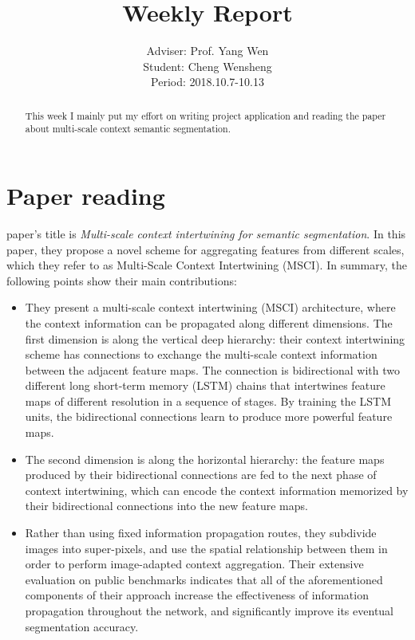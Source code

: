 \documentclass[]{IEEEtran}
\begin{document}
	\title{Weekly Report}
	\author{Adviser: Prof. Yang Wen \\Student: Cheng Wensheng\\ Period: 2018.10.7-10.13
	}
	\maketitle

\begin{abstract}
	This week I mainly put my effort on writing project application and reading the paper about multi-scale context semantic segmentation.
\end{abstract}

\section{Paper reading}
	 paper's title is \emph{Multi-scale context intertwining for semantic segmentation}. In this paper, they propose a novel scheme for aggregating features from different scales, which they refer to as Multi-Scale Context Intertwining (MSCI). In summary, the following points show their main contributions:
	\begin{itemize}
		\item They present a multi-scale context intertwining (MSCI) architecture, where the context information can be propagated along different dimensions. The first dimension is along the vertical deep hierarchy: their context intertwining scheme has connections to exchange the multi-scale context information between
		the adjacent feature maps. The connection is bidirectional with two different long short-term memory (LSTM) chains that intertwines feature maps of different resolution in a sequence of stages. By training the LSTM units, the bidirectional
		connections learn to produce more powerful feature maps. 
		\item The second dimension is along the horizontal hierarchy: the feature maps produced by their bidirectional connections are fed to the next phase of context intertwining, which can encode the context information memorized by their bidirectional connections into the new feature maps.
		
		\item Rather than using fixed information propagation routes, they subdivide images into super-pixels, and use the spatial relationship between them in order to perform image-adapted context aggregation.
		Their extensive evaluation on public benchmarks indicates that all of the aforementioned components of their approach increase the effectiveness of
		information propagation throughout the network, and significantly improve its eventual segmentation accuracy.
	\end{itemize}
	
\end{document}
